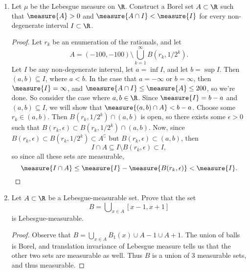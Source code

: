 \documentclass[12pt,letterpaper]{article}
\begin{document}
\begin{enumerate}
\pagebreak
\item Let $\mu$ be the Lebesgue measure on $\R$. Construct a Borel set $A\subset \R$ such that $\measure{A}>0$ and $\measure{A\cap I}<\measure{I}$ for every non-degenerate interval $I\subset\R$. 
\begin{proof}
Let $r_k$ be an enumeration of the rationals, and let 
$$A=(-100,-100)\setminus\bigcup_{k=1}^\infty B(r_k,1/2^k).$$
Let $I$ be any non-degenerate interval, let $a=\inf I$, and let $b=\sup I$. Then $(a,b)\subseteq I$, where $a<b$. In the case that $a=-\infty$ or $b=\infty$, then $\measure{I}=\infty$, and $\measure{A\cap I}\leq\measure{A}\leq200$, so we're done. So consider the case where $a,b\in\R$. Since $\measure{I}=b-a$ and $(a,b)\subseteq I$, we will show that $\measure{(a,b)\cap A}<b-a$. Choose some $r_k\in(a,b)$. Then $B(r_k,1/2^k)\cap (a,b)$ is open, so there exists some $\epsilon>0$ such that $B(r_k,\epsilon)\subset B(r_k,1/2^k)\cap (a,b)$. Now, since $B(r_k,\epsilon)\subset B(r_k,1/2^k)\subset A^\complement$ but $B(r_k,\epsilon)\subset(a,b)$, then 
$$I\cap A \subseteq I\setminus B(r_k,\epsilon) \subset I,$$ 
so since all these sets are measurable, 
$$\measure{I\cap A}\leq \measure{I}-\measure{B(r_k,\epsilon)} < \measure{I}.$$
\end{proof}

\item Let $A\subset\R$ be a Lebesgue-measurable set. Prove that the set 
$$B=\bigcup\nolimits_{x\in A}[x-1, x+1]$$
is Lebesgue-measurable. 
\begin{proof}
Observe that $B=\bigcup_{x\in A} B_1(x) \cup A-1 \cup A+1$. The union of balls is Borel, and translation invariance of Lebesgue measure tells us that the other two sets are measurable as well. Thus $B$ is a union of 3 measurable sets, and thus measurable. 
\end{proof}




\end{enumerate}
\end{document}
